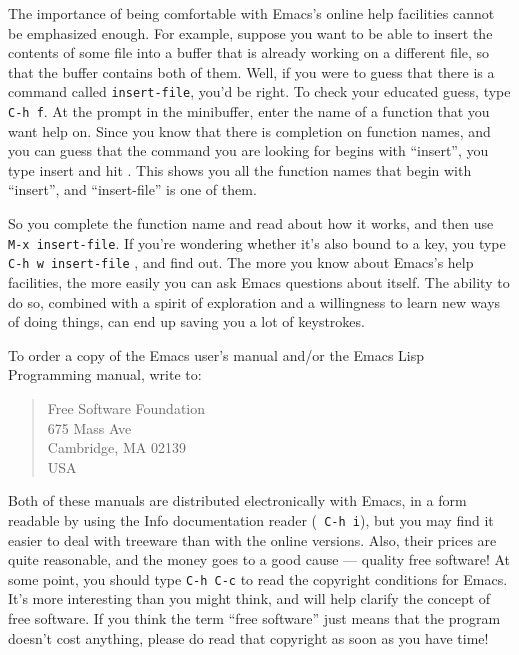         The importance of being comfortable with Emacs's online help
facilities cannot be emphasized enough.  For example, suppose you want
to be able to insert the contents of some file into a buffer that is
already working on a different file, so that the buffer contains both
of them.  Well, if you were to guess that there is a command called
{\tt insert-file}, you'd be right.  To check your educated guess, type
{\tt C-h~f}.  At the prompt in the minibuffer, enter the name of a
function that you want help on.  Since you know that there is
completion on function names, and you can guess that the command you
are looking for begins with ``insert'', you type insert and hit
.  This shows you all the function names that begin with
``insert'', and ``insert-file'' is one of them.

        So you complete the function name and read about how it works,
and then use {\tt M-x insert-file}.  If you're wondering whether it's
also bound to a key, you type {\tt C-h~w~insert-file} ,
and find out.  The more you know about Emacs's help facilities, the
more easily you can ask Emacs questions about itself.  The ability to
do so, combined with a spirit of exploration and a willingness to
learn new ways of doing things, can end up saving you a lot of
keystrokes.

        To order a copy of the Emacs user's manual and/or the Emacs
Lisp Programming manual, write to:

\begin{samepage}
   \begin{quote}
Free Software Foundation \\
675 Mass Ave \\
Cambridge, MA 02139 \\
USA
   \end{quote}
\end{samepage}

        Both of these manuals are distributed electronically with
Emacs, in a form readable by using the Info documentation reader ({\tt
C-h~i}), but you may find it easier to deal with treeware than with
the online versions.  Also, their prices are quite reasonable, and the
money goes to a good cause --- quality free software!  At some point,
you should type {\tt C-h~C-c} to read the copyright conditions for
Emacs.  It's more interesting than you might think, and will help
clarify the concept of free software.  If you think the term ``free
software'' just means that the program doesn't cost anything, please
do read that copyright as soon as you have time!



